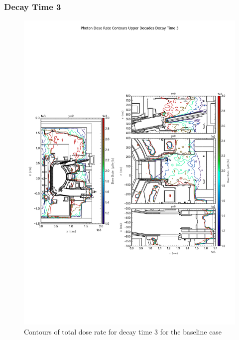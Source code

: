 \documentclass[12pt]{article}
\begin{document}
\subsubsection*{Decay Time 3}
\begin{figure}[ht!]
\centering
\includegraphics[trim={0cm 8cm, 0cm 8cm},clip,scale=0.6]{../plots/final_model/Photon_Dose_Rate_Contours_Upper_Decades_Decay_Time_3.png}
\caption{Contours of total dose rate for decay time 3 for the baseline case}
\label{fig:photons_dc3_nob4c_contours}
\end{figure}
\end{document}
